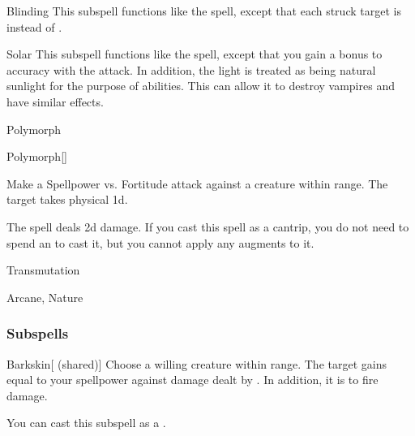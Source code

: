 \begin{ability}[\nth{5}]{Blinding}
This subspell functions like the  spell, except that each struck target is  instead of .
\end{ability}
\vspace{0.25em}


\begin{ability}[\nth{6}]{Solar}
This subspell functions like the  spell, except that you gain a  bonus to accuracy with the attack.
In addition, the light is treated as being natural sunlight for the purpose of abilities.
This can allow it to destroy vampires and have similar effects.
\end{ability}
\vspace{0.25em}

\newpage
\begin{spellsection}{Polymorph}

\begin{spellheader}
\end{spellheader}


\begin{ability}{Polymorph}[]

Make a Spellpower vs. Fortitude attack against a creature within \rngmed range.
\hit The target takes physical  \plus1d.

\end{ability}



 The spell deals \minus2d damage. If you cast this spell as a cantrip,
you do not need to spend an  to cast it,
but you cannot apply any augments to it.


 Transmutation

 Arcane, Nature
\end{spellsection}


\subsubsection{Subspells}


\begin{ability}[\nth{2}]{Barkskin}[ (shared)]
Choose a willing creature within \rngclose range.
The target gains  equal to your spellpower against damage dealt by .
In addition, it is  to fire damage.

You can cast this subspell as a .
\end{ability}
\vspace{0.25em}


